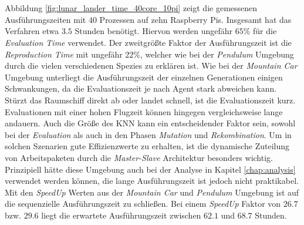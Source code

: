 \\\\
Abbildung \ref{fig:lunar_lander_time_40core_10pi} zeigt die gemessenen Ausführungszeiten mit $40$ Prozessen auf zehn Raspberry Pis. Insgesamt hat das Verfahren etwa $3.5$ Stunden benötigt. Hiervon werden ungefähr $65\%$ für die \emph{Evaluation Time} verwendet. Der zweitgrößte Faktor der Ausführungszeit ist die \emph{Reproduction Time} mit ungefähr $22\%$, welcher wie bei der \emph{Pendulum} Umgebung durch die vielen verschiedenen Spezies zu erklären ist. Wie bei der \emph{Mountain Car} Umgebung unterliegt die Ausführungszeit der einzelnen Generationen einigen Schwankungen, da die Evaluationszeit je nach Agent stark abweichen kann. Stürzt das Raumschiff direkt ab oder landet schnell, ist die Evaluationszeit kurz. Evaluationen mit einer hohen Flugzeit können hingegen vergleichsweise lange andauern. Auch die Größe des \ac{KNN} kann ein entscheidender Faktor sein, sowohl bei der \emph{Evaluation} als auch in den Phasen \emph{Mutation} und \emph{Rekombination}. Um in solchen Szenarien gute Effizienzwerte zu erhalten, ist die dynamische Zuteilung von Arbeitspaketen durch die \emph{Master-Slave} Architektur besonders wichtig. Prinzipiell hätte diese Umgebung auch bei der Analyse in Kapitel \ref{chap:analysis} verwendet werden können, die lange Ausführungszeit ist jedoch nicht praktikabel. Mit den \emph{SpeedUp} Werten aus der \emph{Mountain Car} und \emph{Pendulum} Umgebung ist auf die sequenzielle Ausführungszeit zu schließen. Bei einem \emph{SpeedUp} Faktor von $26.7$ bzw. $29.6$ liegt die erwartete Ausführungszeit zwischen $62.1$ und $68.7$ Stunden. 